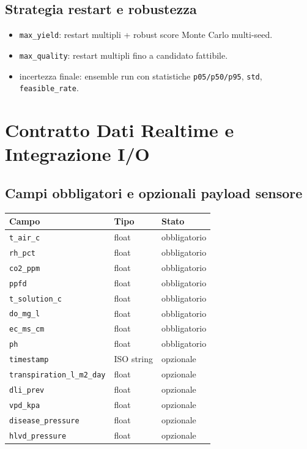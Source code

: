 ﻿\documentclass[11pt,a4paper]{report}
\begin{document}
\section{Strategia restart e robustezza}
\begin{itemize}
  \item \texttt{max\_yield}: restart multipli + robust score Monte Carlo multi-seed.
  \item \texttt{max\_quality}: restart multipli fino a candidato fattibile.
  \item incertezza finale: ensemble run con statistiche \texttt{p05/p50/p95}, \texttt{std}, \texttt{feasible\_rate}.
\end{itemize}

\newpage
\chapter{Contratto Dati Realtime e Integrazione I/O}

\section{Campi obbligatori e opzionali payload sensore}
\begin{longtable}{@{}p{3.6cm}p{2.8cm}p{6.8cm}@{}}
\toprule
Campo & Tipo & Stato \\ \midrule
\texttt{t\_air\_c} & float & obbligatorio \\
\texttt{rh\_pct} & float & obbligatorio \\
\texttt{co2\_ppm} & float & obbligatorio \\
\texttt{ppfd} & float & obbligatorio \\
\texttt{t\_solution\_c} & float & obbligatorio \\
\texttt{do\_mg\_l} & float & obbligatorio \\
\texttt{ec\_ms\_cm} & float & obbligatorio \\
\texttt{ph} & float & obbligatorio \\
\texttt{timestamp} & ISO string & opzionale \\
\texttt{transpiration\_l\_m2\_day} & float & opzionale \\
\texttt{dli\_prev} & float & opzionale \\
\texttt{vpd\_kpa} & float & opzionale \\
\texttt{disease\_pressure} & float & opzionale \\
\texttt{hlvd\_pressure} & float & opzionale \\
\bottomrule
\end{longtable}
\end{document}
